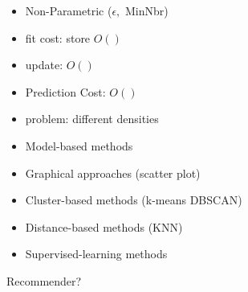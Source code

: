 \documentclass[1pt,letter]{article}
\def\items#1{\begin{itemize}[noitemsep,topsep=0pt,parsep=0pt,partopsep=0pt]#1\end{itemize}}
\begin{document}
\begin{minipage}{0.45\textwidth}
{            \items{
                \item Non-Parametric ($\epsilon,$ MinNbr)
                \item fit cost: store $O()$
                \item update: $O()$ 
                \item Prediction Cost: $O()$ 
                \item problem: different densities 
            }
        \item
            \items{
                \item Model-based methods
                \item Graphical approaches (scatter plot)
                \item Cluster-based methods (k-means DBSCAN)
                \item Distance-based methods (KNN)
                \item Supervised-learning methods    
            }
        \item
            Recommender?
    }





\end{minipage}
\hfill
\end{document}

